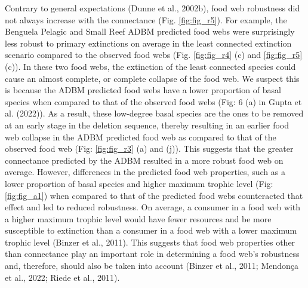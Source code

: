 \documentclass{article}
\begin{document}
Contrary to general expectations (Dunne et al., 2002b), food web
robustness did not always increase with the connectance (Fig.
\ref{fig:fig_r5}). For example, the Benguela Pelagic and Small Reef ADBM
predicted food webs were surprisingly less robust to primary extinctions
on average in the least connected extinction scenario compared to the
observed food webs (Fig. \ref{fig:fig_r4} (c) and \ref{fig:fig_r5} (c)).
In these two food webs, the extinction of the least connected species
could cause an almost complete, or complete collapse of the food web. We
suspect this is because the ADBM predicted food webs have a lower
proportion of basal species when compared to that of the observed food
webs (Fig: 6 (a) in Gupta et al. (2022)). As a result, these low-degree
basal species are the ones to be removed at an early stage in the
deletion sequence, thereby resulting in an earlier food web collapse in
the ADBM predicted food web as compared to that of the observed food web
(Fig: \ref{fig:fig_r3} (a) and (j)). This suggests that the greater
connectance predicted by the ADBM resulted in a more robust food web on
average. However, differences in the predicted food web properties, such
as a lower proportion of basal species and higher maximum trophic level
(Fig: \ref{fig:fig_a1}) when compared to that of the predicted food webs
counteracted that effect and led to reduced robustness. On average, a
consumer in a food web with a higher maximum trophic level would have
fewer resources and be more susceptible to extinction than a consumer in
a food web with a lower maximum trophic level (Binzer et al., 2011).
This suggests that food web properties other than connectance play an
important role in determining a food web's robustness and, therefore,
should also be taken into account (Binzer et al., 2011; Mendonça et al.,
2022; Riede et al., 2011).
\end{document}
